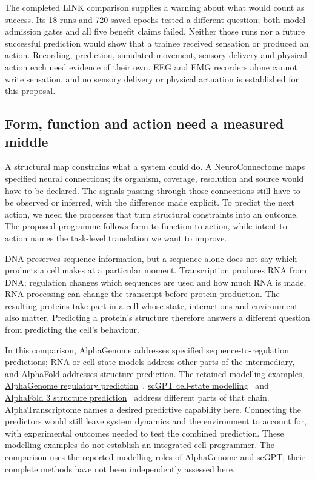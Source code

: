 The completed LINK comparison supplies a warning about what would count as
success. Its 18 runs and 720 saved epochs tested a different question; both
model-admission gates and all five benefit claims failed. Neither those runs
nor a future successful prediction would show that a trainee received sensation
or produced an action. Recording, prediction, simulated movement, sensory
delivery and physical action each need evidence of their own. EEG and EMG
recorders alone cannot write sensation, and no sensory delivery or physical
actuation is established for this proposal.

\subsection{Form, function and action need a measured middle}
A structural map constrains what a system could do. A NeuroConnectome maps
specified neural connections; its organism, coverage, resolution and source
would have to be declared. The signals passing through those connections
still have to be observed or inferred, with the difference made explicit.
To predict the next action, we need the processes that turn structural
constraints into an outcome. The proposed programme follows form to function
to action, while intent to action names the task-level translation we want
to improve.

DNA preserves sequence information, but a sequence alone does not say which products a cell makes at a particular moment. Transcription produces RNA from DNA; regulation changes which sequences are used and how much RNA is made. RNA processing can change the transcript before protein production. The resulting proteins take part in a cell whose state, interactions and environment also matter. Predicting a protein's structure therefore answers a different question from predicting the cell's behaviour.

In this comparison, AlphaGenome addresses specified sequence-to-regulation predictions; RNA or cell-state models address other parts of the intermediary, and AlphaFold addresses structure prediction. The retained modelling examples, \href{https://www.nature.com/articles/s41586-025-10014-0}{AlphaGenome regulatory prediction}~\cite{alphagenomeRetained},
\href{https://www.nature.com/articles/s41592-024-02201-0}{scGPT cell-state modelling}~\cite{scgptRetained} and
\href{https://www.nature.com/articles/s41586-024-07487-w}{AlphaFold 3 structure prediction}~\cite{alphafold32024}
address different parts of that chain. AlphaTranscriptome names a desired
predictive capability here. Connecting the predictors would still leave system
dynamics and the environment to account for, with experimental outcomes needed
to test the combined prediction. These modelling examples do not establish an
integrated cell programmer. The comparison uses the reported modelling roles of
AlphaGenome and scGPT; their complete methods have not been independently
assessed here.

